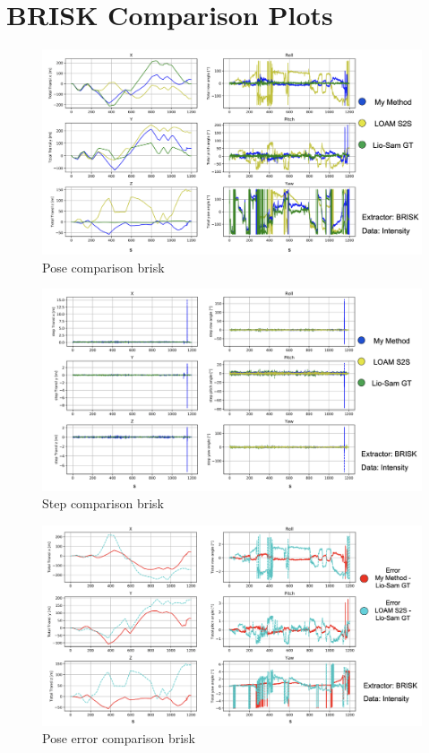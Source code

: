 \section{BRISK Comparison Plots}{

    \begin{figure}[ht]
        \centering
        \includegraphics[scale = 0.25]{images/comparison_appendix/pose_brisk.png}
        \caption{Pose comparison brisk}
        \label{fig:pose_comparison_brisk}
    \end{figure}
    
    \begin{figure}[ht]
        \centering
        \includegraphics[scale = 0.25]{images/comparison_appendix/steps_brisk.png}
        \caption{Step comparison brisk}
        \label{fig:step_comparison_brisk}
    \end{figure}

    \begin{figure}[ht]
        \centering
        \includegraphics[scale = 0.25]{images/comparison_appendix/pose_error_brisk.png}
        \caption{Pose error comparison brisk}
        \label{fig:pose_error_comparison_brisk}
    \end{figure}
    
}

